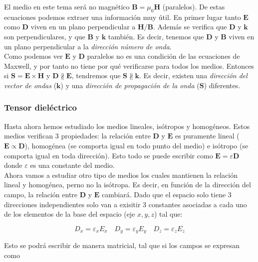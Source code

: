 \documentclass[12pt,a4paper]{article}
\newcommand{\Bn}{\mathbf{B}}
\newcommand{\En}{\mathbf{E}}
\newcommand{\Dn}{\mathbf{D}}
\newcommand{\Hn}{\mathbf{H}}
\newcommand{\kn}{\mathbf{k}}
\newcommand{\Sn}{\mathbf{S}}
\numberwithin{equation}{section}
\numberwithin{figure}{section}
\begin{document}
El medio en este tema será no magnético $\Bn = \mu_0 \Hn$ (paralelos). De estas ecuaciones podemos extraer una información muy útil. En primer lugar tanto $\En$ como $\Dn$ viven en un plano perpendicular a $\Hn/\Bn$. Además  se verifica que $\Dn$ y $\kn$ son perpendiculares, y que $\Bn$ y $\kn$ también. Es decir, tenemos que $\Dn$ y $\Bn$ viven en un plano perpendicular a la \textit{dirección número de onda}. \\

Como podemos ver $\En$ y $\Dn$ paralelos no es una condición de las ecuaciones de Maxwell, y por tanto no tiene por qué verificarse para todos los medios. Entonces si $\Sn = \En \times \Hn$ y $\Dn \nparallel \En$, tendremos que $\Sn \nparallel \kn$. Es decir, existen una \textit{dirección del vector de ondas} ($\kn$) y una \textit{dirección de propagación de la onda} ($\Sn$) diferentes. 


\subsubsection{Tensor dieléctrico}

Hasta ahora hemos estudiado los medios lineales, isótropos y homogéneos. Estos medios verifican 3 propiedades: la relación entre $\Dn$ y $\En$ es puramente lineal ($\En \varpropto \Dn$), homogénea (se comporta igual en todo punto del medio) e isótropo (se comporta igual en toda dirección). Esto todo se puede escribir como $\En = \varepsilon \Dn$ donde $\varepsilon $ es una constante del medio. \\

Ahora vamos a estudiar otro tipo de medios los cuales mantienen la relación lineal y homogénea, perno no la isótropa. Es decir, en función de la dirección del campo, la relación entre $\Dn$ y $\En$ cambiará. Dado que el espacio solo tiene 3 direcciones independientes solo van a exisitir 3 constantes asociadas a cada uno de los elementos de la base del espacio (eje $x,y,z$) tal que:

\begin{equation}
D_x = \varepsilon_x E_x \quad D_y = \varepsilon_y E_y \quad D_z = \varepsilon_z E_z 
\end{equation}

Esto se podrá escribir de manera matricial, tal que si los campos se expresan como
\end{document}
